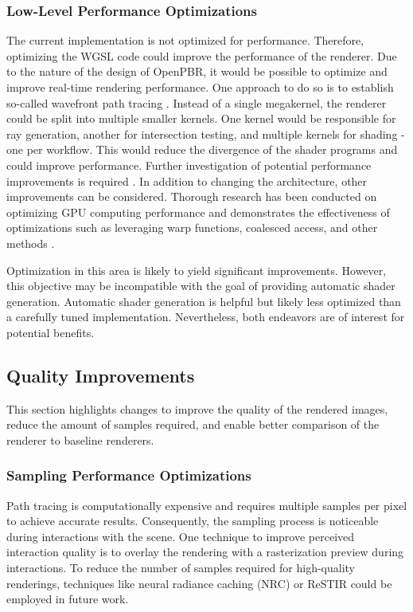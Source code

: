 \subsubsection*{Low-Level Performance Optimizations}

The current implementation is not optimized for performance. Therefore, optimizing the \gls{WGSL} code could improve the performance of the renderer. Due to the nature of the design of \gls{OpenPBR}, it would be possible to optimize and improve real-time rendering performance. One approach to do so is to establish so-called wavefront path tracing \cite{laine2013megakernels}. Instead of a single megakernel, the renderer could be split into multiple smaller kernels. One kernel would be responsible for ray generation, another for intersection testing, and multiple kernels for shading - one per workflow. This would reduce the divergence of the shader programs and could improve performance. Further investigation of potential performance improvements is required \cite{wavefrontComparisonInTableA5,mitsubaWavefrontVsMegakernel}. In addition to changing the architecture, other improvements can be considered. Thorough research has been conducted on optimizing \gls{GPU} computing performance and demonstrates the effectiveness of optimizations such as leveraging warp functions, coalesced access, and other methods \cite{surveyOnOptimizationTechniquesForGPU}.

Optimization in this area is likely to yield significant improvements. However, this objective may be incompatible with the goal of providing automatic shader generation. Automatic shader generation is helpful but likely less optimized than a carefully tuned implementation. Nevertheless, both endeavors are of interest for potential benefits.

\subsection*{Quality Improvements}

This section highlights changes to improve the quality of the rendered images, reduce the amount of samples required, and enable better comparison of the renderer to baseline renderers.

\subsubsection*{Sampling Performance Optimizations}

Path tracing is computationally expensive and requires multiple samples per pixel to achieve accurate results. Consequently, the sampling process is noticeable during interactions with the scene. One technique to improve perceived interaction quality is to overlay the rendering with a rasterization preview during interactions. To reduce the number of samples required for high-quality renderings, techniques like neural radiance caching (NRC) \cite{muller2021real} or \gls{ReSTIR} \cite{restir} could be employed in future work.

